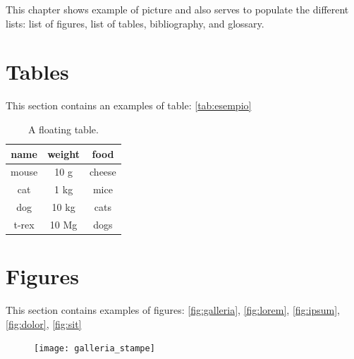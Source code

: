 {{{{\newpage

This chapter shows example of picture and also serves to populate the different lists: list of figures, list of tables, bibliography, and glossary.

\section{Tables}

This section contains an examples of table: \autoref{tab:esempio}

\begin{table}[H]
	\centering
	\begin{tabular}{ccc}
		\toprule
		name & weight & food \\ 
		\midrule
		mouse	& 10 g	& cheese \\
		cat	& 1 kg	& mice \\
		dog	& 10 kg	& cats \\
		t-rex	& 10 Mg	& dogs \\
		\bottomrule 
	\end{tabular}
	\caption[A floating table]{A floating table.}
	\label{tab:esempio}
\end{table}

\section{Figures}

This section contains examples of figures: \autoref{fig:galleria}, \autoref{fig:lorem}, \autoref{fig:ipsum}, \autoref{fig:dolor}, \autoref{fig:sit}

\begin{figure}[H] 
	\centering 
	\texttt{[image: galleria\_stampe]} 
	\label{fig:galleria} 
\end{figure}

}}}}
